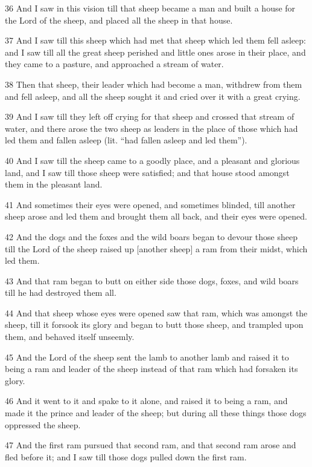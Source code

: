 \par 36 And I saw in this vision till that sheep became a man and built a house for the Lord of the sheep, and placed all the sheep in that house.
\par 37 And I saw till this sheep which had met that sheep which led them fell asleep: and I saw till all the great sheep perished and little ones arose in their place, and they came to a pasture, and approached a stream of water.
\par 38 Then that sheep, their leader which had become a man, withdrew from them and fell asleep, and all the sheep sought it and cried over it with a great crying.
\par 39 And I saw till they left off crying for that sheep and crossed that stream of water, and there arose the two sheep as leaders in the place of those which had led them and fallen asleep (lit. “had fallen asleep and led them”).
\par 40 And I saw till the sheep came to a goodly place, and a pleasant and glorious land, and I saw till those sheep were satisfied; and that house stood amongst them in the pleasant land.
\par 41 And sometimes their eyes were opened, and sometimes blinded, till another sheep arose and led them and brought them all back, and their eyes were opened.
\par 42 And the dogs and the foxes and the wild boars began to devour those sheep till the Lord of the sheep raised up [another sheep] a ram from their midst, which led them.
\par 43 And that ram began to butt on either side those dogs, foxes, and wild boars till he had destroyed them all.
\par 44 And that sheep whose eyes were opened saw that ram, which was amongst the sheep, till it forsook its glory and began to butt those sheep, and trampled upon them, and behaved itself unseemly.
\par 45 And the Lord of the sheep sent the lamb to another lamb and raised it to being a ram and leader of the sheep instead of that ram which had forsaken its glory.
\par 46 And it went to it and spake to it alone, and raised it to being a ram, and made it the prince and leader of the sheep; but during all these things those dogs oppressed the sheep.
\par 47 And the first ram pursued that second ram, and that second ram arose and fled before it; and I saw till those dogs pulled down the first ram.
